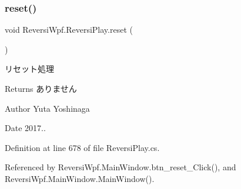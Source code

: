 \subsubsection{\texorpdfstring{reset()}{reset()}}
{\footnotesize\ttfamily void Reversi\+Wpf.\+Reversi\+Play.\+reset (\begin{DoxyParamCaption}{ }\end{DoxyParamCaption})}



リセット処理 

\begin{DoxyReturn}{Returns}
ありません 
\end{DoxyReturn}
\begin{DoxyAuthor}{Author}
Yuta Yoshinaga 
\end{DoxyAuthor}
\begin{DoxyDate}{Date}
2017.. 
\end{DoxyDate}


Definition at line 678 of file Reversi\+Play.\+cs.



Referenced by Reversi\+Wpf.\+Main\+Window.\+btn\+\_\+reset\+\_\+\+Click(), and Reversi\+Wpf.\+Main\+Window.\+Main\+Window().

